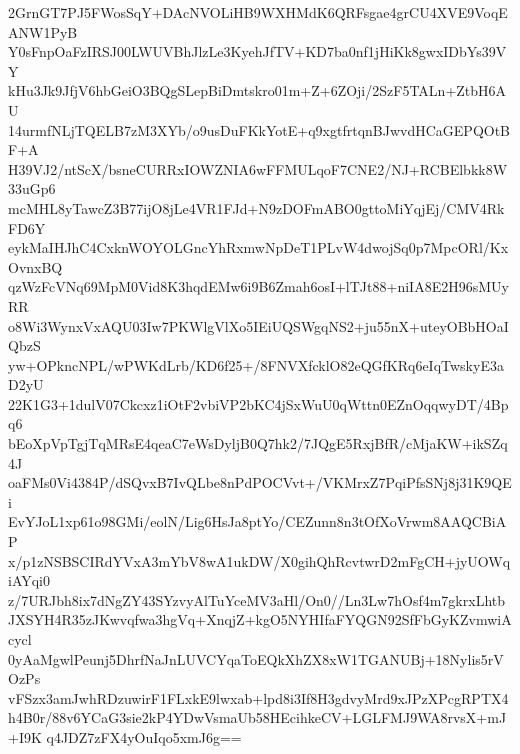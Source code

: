 2GrnGT7PJ5FWosSqY+DAcNVOLiHB9WXHMdK6QRFsgae4grCU4XVE9VoqEANW1PyB
Y0sFnpOaFzIRSJ00LWUVBhJlzLe3KyehJfTV+KD7ba0nf1jHiKk8gwxIDbYs39VY
kHu3Jk9JfjV6hbGeiO3BQgSLepBiDmtskro01m+Z+6ZOji/2SzF5TALn+ZtbH6AU
14urmfNLjTQELB7zM3XYb/o9usDuFKkYotE+q9xgtfrtqnBJwvdHCaGEPQOtBF+A
H39VJ2/ntScX/bsneCURRxIOWZNIA6wFFMULqoF7CNE2/NJ+RCBElbkk8W33uGp6
mcMHL8yTawcZ3B77ijO8jLe4VR1FJd+N9zDOFmABO0gttoMiYqjEj/CMV4RkFD6Y
eykMaIHJhC4CxknWOYOLGncYhRxmwNpDeT1PLvW4dwojSq0p7MpcORl/KxOvnxBQ
qzWzFcVNq69MpM0Vid8K3hqdEMw6i9B6Zmah6osI+lTJt88+niIA8E2H96sMUyRR
o8Wi3WynxVxAQU03Iw7PKWlgVlXo5IEiUQSWgqNS2+ju55nX+uteyOBbHOaIQbzS
yw+OPkncNPL/wPWKdLrb/KD6f25+/8FNVXfcklO82eQGfKRq6eIqTwskyE3aD2yU
22K1G3+1dulV07Ckcxz1iOtF2vbiVP2bKC4jSxWuU0qWttn0EZnOqqwyDT/4Bpq6
bEoXpVpTgjTqMRsE4qeaC7eWsDyljB0Q7hk2/7JQgE5RxjBfR/cMjaKW+ikSZq4J
oaFMs0Vi4384P/dSQvxB7IvQLbe8nPdPOCVvt+/VKMrxZ7PqiPfsSNj8j31K9QEi
EvYJoL1xp61o98GMi/eolN/Lig6HsJa8ptYo/CEZunn8n3tOfXoVrwm8AAQCBiAP
x/p1zNSBSCIRdYVxA3mYbV8wA1ukDW/X0gihQhRcvtwrD2mFgCH+jyUOWqiAYqi0
z/7URJbh8ix7dNgZY43SYzvyAlTuYceMV3aHl/On0//Ln3Lw7hOsf4m7gkrxLhtb
JXSYH4R35zJKwvqfwa3hgVq+XnqjZ+kgO5NYHIfaFYQGN92SfFbGyKZvmwiAcycl
0yAaMgwlPeunj5DhrfNaJnLUVCYqaToEQkXhZX8xW1TGANUBj+18Nylis5rVOzPs
vFSzx3amJwhRDzuwirF1FLxkE9lwxab+lpd8i3If8H3gdvyMrd9xJPzXPcgRPTX4
h4B0r/88v6YCaG3sie2kP4YDwVsmaUb58HEcihkeCV+LGLFMJ9WA8rvsX+mJ+I9K
q4JDZ7zFX4yOuIqo5xmJ6g==
